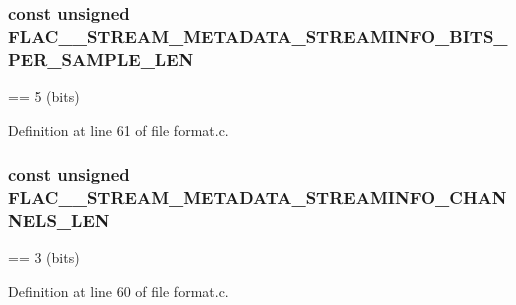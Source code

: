 \subsubsection[{\texorpdfstring{F\+L\+A\+C\+\_\+\+\_\+\+S\+T\+R\+E\+A\+M\+\_\+\+M\+E\+T\+A\+D\+A\+T\+A\+\_\+\+S\+T\+R\+E\+A\+M\+I\+N\+F\+O\+\_\+\+B\+I\+T\+S\+\_\+\+P\+E\+R\+\_\+\+S\+A\+M\+P\+L\+E\+\_\+\+L\+EN}{FLAC__STREAM_METADATA_STREAMINFO_BITS_PER_SAMPLE_LEN}}]{ {\bf const} unsigned F\+L\+A\+C\+\_\+\+\_\+\+S\+T\+R\+E\+A\+M\+\_\+\+M\+E\+T\+A\+D\+A\+T\+A\+\_\+\+S\+T\+R\+E\+A\+M\+I\+N\+F\+O\+\_\+\+B\+I\+T\+S\+\_\+\+P\+E\+R\+\_\+\+S\+A\+M\+P\+L\+E\+\_\+\+L\+EN}\hypertarget{group__flac__format_ga84c55a68f58fff56e23fda6d24bd3510}{}\label{group__flac__format_ga84c55a68f58fff56e23fda6d24bd3510}
== 5 (bits) 

Definition at line 61 of file format.\+c.

\subsubsection[{\texorpdfstring{F\+L\+A\+C\+\_\+\+\_\+\+S\+T\+R\+E\+A\+M\+\_\+\+M\+E\+T\+A\+D\+A\+T\+A\+\_\+\+S\+T\+R\+E\+A\+M\+I\+N\+F\+O\+\_\+\+C\+H\+A\+N\+N\+E\+L\+S\+\_\+\+L\+EN}{FLAC__STREAM_METADATA_STREAMINFO_CHANNELS_LEN}}]{ {\bf const} unsigned F\+L\+A\+C\+\_\+\+\_\+\+S\+T\+R\+E\+A\+M\+\_\+\+M\+E\+T\+A\+D\+A\+T\+A\+\_\+\+S\+T\+R\+E\+A\+M\+I\+N\+F\+O\+\_\+\+C\+H\+A\+N\+N\+E\+L\+S\+\_\+\+L\+EN}\hypertarget{group__flac__format_gadc990fec49da063c33debfc2817c0e98}{}\label{group__flac__format_gadc990fec49da063c33debfc2817c0e98}
== 3 (bits) 

Definition at line 60 of file format.\+c.

